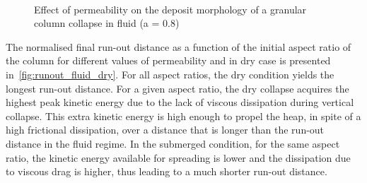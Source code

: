 \begin{figure}
\\
\caption{Effect of permeability on the deposit morphology of a granular column 
collapse in fluid (a = 0.8)}
\label{fig:a08_dense_snapshots}
\end{figure}

The normalised final run-out distance as a function of the initial aspect ratio 
of the column for different values of permeability and in dry case is presented 
in~\cref{fig:runout_fluid_dry}. For all aspect ratios, the dry condition yields 
the longest run-out distance. For a given aspect ratio, the dry collapse 
acquires the highest peak kinetic energy due to the lack of viscous dissipation 
during vertical collapse. This extra kinetic energy is high enough to propel 
the heap, in spite of a high frictional dissipation, over a distance that is 
longer than the run-out distance in the fluid regime. In the submerged 
condition, for the same aspect ratio, the kinetic energy available for 
spreading is lower and the dissipation due to viscous drag is higher, thus 
leading to a much shorter run-out distance. 

